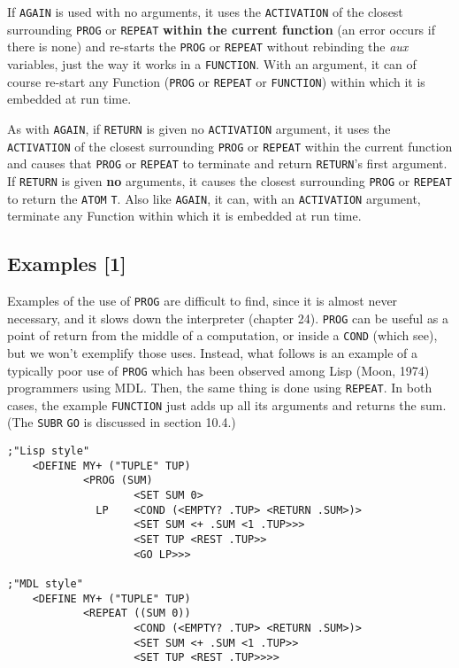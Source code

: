 \documentclass[a4paper]{scrbook}
\begin{document}
If \texttt{AGAIN} is used with no arguments, it uses the \texttt{ACTIVATION} of the closest surrounding \texttt{PROG} or
\texttt{REPEAT} \textbf{within the current function} (an error occurs if there is none) and re-starts the \texttt{PROG} or
\texttt{REPEAT} without rebinding the \emph{aux} variables, just the way it works in a \texttt{FUNCTION}. With an argument,
it can of course re-start any Function (\texttt{PROG} or \texttt{REPEAT} or \texttt{FUNCTION}) within which it is embedded
at run time.

As with \texttt{AGAIN}, if \texttt{RETURN} is given no \texttt{ACTIVATION} argument, it uses the \texttt{ACTIVATION} of the
closest surrounding \texttt{PROG} or \texttt{REPEAT} within the current function and causes that \texttt{PROG} or
\texttt{REPEAT} to terminate and return \texttt{RETURN}'s first argument. If \texttt{RETURN} is given \textbf{no}
arguments, it causes the closest surrounding \texttt{PROG} or \texttt{REPEAT} to return the \texttt{ATOM} \texttt{T}. Also
like \texttt{AGAIN}, it can, with an \texttt{ACTIVATION} argument, terminate any Function within which it is embedded at
run time.

\subsection{Examples {[}1{]}}\label{examples-1-2}

Examples of the use of \texttt{PROG} are difficult to find, since it is almost never necessary, and it slows down the
interpreter (chapter 24). \texttt{PROG} can be useful as a point of return from the middle of a computation, or inside a
\texttt{COND} (which see), but we won't exemplify those uses. Instead, what follows is an example of a typically poor use
of \texttt{PROG} which has been observed among Lisp (Moon, 1974) programmers using MDL. Then, the same thing is done using
\texttt{REPEAT}. In both cases, the example \texttt{FUNCTION} just adds up all its arguments and returns the sum. (The
\texttt{SUBR} \texttt{GO} is discussed in section 10.4.)

\begin{verbatim}
;"Lisp style"
    <DEFINE MY+ ("TUPLE" TUP)
            <PROG (SUM)
                    <SET SUM 0>
              LP    <COND (<EMPTY? .TUP> <RETURN .SUM>)>
                    <SET SUM <+ .SUM <1 .TUP>>>
                    <SET TUP <REST .TUP>>
                    <GO LP>>>

;"MDL style"
    <DEFINE MY+ ("TUPLE" TUP)
            <REPEAT ((SUM 0))
                    <COND (<EMPTY? .TUP> <RETURN .SUM>)>
                    <SET SUM <+ .SUM <1 .TUP>>
                    <SET TUP <REST .TUP>>>>
\end{verbatim}
\end{document}
